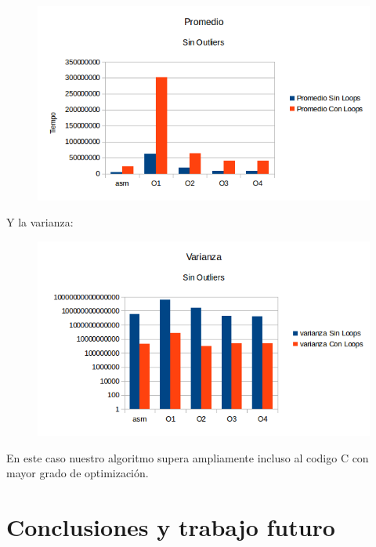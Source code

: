\documentclass[a4paper]{article}
\begin{document}
\begin{figure}[h!]
  \begin{center}
  \includegraphics[scale=0.66]{GraficosTesting/ban/PSO.png}
  \label{nombreparareferenciar11}
  \end{center}
\end{figure}

Y la varianza:

\begin{figure}[h!]
  \begin{center}
  \includegraphics[scale=0.66]{GraficosTesting/ban/VSO.png}
  \label{nombreparareferenciar12}
  \end{center}
\end{figure}

En este caso nuestro algoritmo supera ampliamente incluso al codigo C con mayor grado de optimización.


\section{Conclusiones y trabajo futuro}
\end{document}
